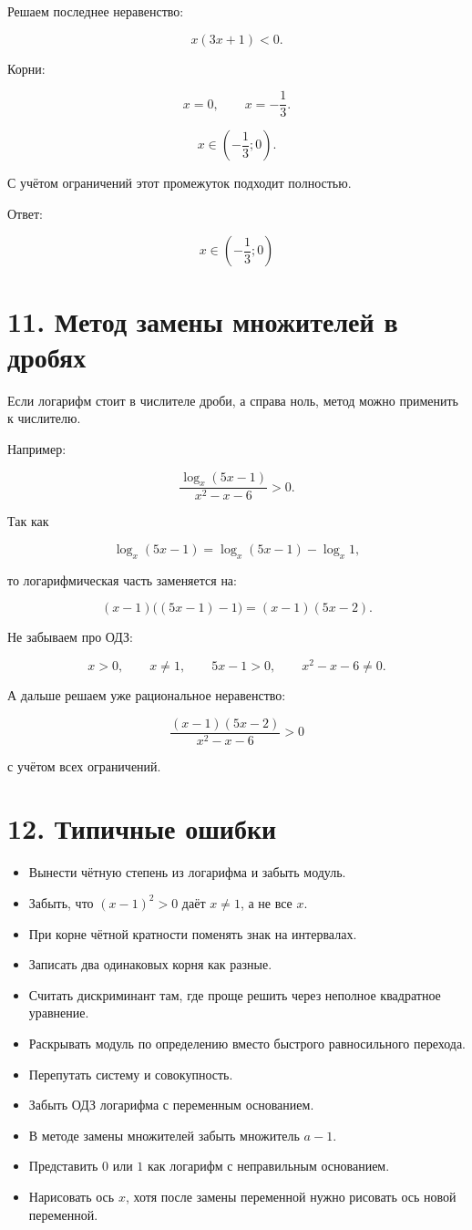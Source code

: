 \documentclass[a4paper,12pt]{article}
\begin{document}
Решаем последнее неравенство:

\[
x(3x+1)<0.
\]

Корни:

\[
x=0,
\qquad
x=-\frac13.
\]

\[
x\in\left(-\frac13;0\right).
\]

С учётом ограничений этот промежуток подходит полностью.

Ответ:

\[
\boxed{x\in\left(-\frac13;0\right)}
\]

\section*{11. Метод замены множителей в дробях}

Если логарифм стоит в числителе дроби, а справа ноль, метод можно применить к числителю.

Например:

\[
\frac{\log_x(5x-1)}{x^2-x-6}>0.
\]

Так как

\[
\log_x(5x-1)=\log_x(5x-1)-\log_x1,
\]

то логарифмическая часть заменяется на:

\[
(x-1)\bigl((5x-1)-1\bigr)
=
(x-1)(5x-2).
\]

Не забываем про ОДЗ:

\[
x>0,
\qquad
x\ne1,
\qquad
5x-1>0,
\qquad
x^2-x-6\ne0.
\]

А дальше решаем уже рациональное неравенство:

\[
\frac{(x-1)(5x-2)}{x^2-x-6}>0
\]

с учётом всех ограничений.

\section*{12. Типичные ошибки}

\begin{itemize}
  \item Вынести чётную степень из логарифма и забыть модуль.
  \item Забыть, что \((x-1)^2>0\) даёт \(x\ne1\), а не все \(x\).
  \item При корне чётной кратности поменять знак на интервалах.
  \item Записать два одинаковых корня как разные.
  \item Считать дискриминант там, где проще решить через неполное квадратное уравнение.
  \item Раскрывать модуль по определению вместо быстрого равносильного перехода.
  \item Перепутать систему и совокупность.
  \item Забыть ОДЗ логарифма с переменным основанием.
  \item В методе замены множителей забыть множитель \(a-1\).
  \item Представить \(0\) или \(1\) как логарифм с неправильным основанием.
  \item Нарисовать ось \(x\), хотя после замены переменной нужно рисовать ось новой переменной.
\end{itemize}
\end{document}
